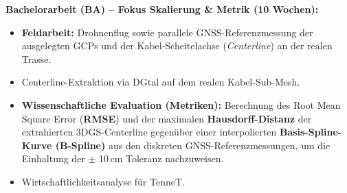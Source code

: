 \documentclass[12pt,a4paper]{article}
\begin{document}
\vspace{0.3cm}
\noindent\textbf{Bachelorarbeit (BA) -- Fokus Skalierung \& Metrik (10 Wochen):}
\begin{itemize}[noitemsep]
    \item \textbf{Feldarbeit:} Drohnenflug sowie parallele GNSS-Referenzmessung der ausgelegten GCPs und der Kabel-Scheitelachse (\textit{Centerline}) an der realen Trasse.
    \item Centerline-Extraktion via DGtal auf dem realen Kabel-Sub-Mesh.
    \item \textbf{Wissenschaftliche Evaluation (Metriken):} Berechnung des Root Mean Square Error (\textbf{RMSE}) und der maximalen \textbf{Hausdorff-Distanz} der extrahierten 3DGS-Centerline gegenüber einer interpolierten \textbf{Basis-Spline-Kurve (B-Spline)} aus den diskreten GNSS-Referenzmessungen, um die Einhaltung der $\pm$ 10\,cm Toleranz nachzuweisen.
    \item Wirtschaftlichkeitsanalyse für TenneT.
\end{itemize}
\end{document}
